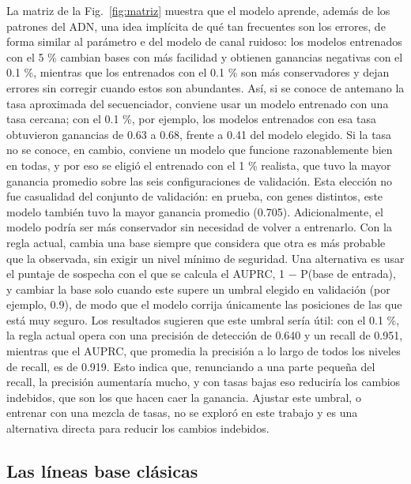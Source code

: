 \documentclass[sigconf,nonacm]{acmart}
\begin{document}
La matriz de la Fig.~\ref{fig:matriz} muestra que el modelo aprende, además de los patrones del ADN, una idea implícita de qué tan frecuentes son los errores, de forma similar al parámetro e del modelo de canal ruidoso: los modelos entrenados con el 5 \% cambian bases con más facilidad y obtienen ganancias negativas con el 0.1 \%, mientras que los entrenados con el 0.1 \% son más conservadores y dejan errores sin corregir cuando estos son abundantes. Así, si se conoce de antemano la tasa aproximada del secuenciador, conviene usar un modelo entrenado con una tasa cercana; con el 0.1 \%, por ejemplo, los modelos entrenados con esa tasa obtuvieron ganancias de 0.63 a 0.68, frente a 0.41 del modelo elegido. Si la tasa no se conoce, en cambio, conviene un modelo que funcione razonablemente bien en todas, y por eso se eligió el entrenado con el 1 \% realista, que tuvo la mayor ganancia promedio sobre las seis configuraciones de validación. Esta elección no fue casualidad del conjunto de validación: en prueba, con genes distintos, este modelo también tuvo la mayor ganancia promedio (0.705). Adicionalmente, el modelo podría ser más conservador sin necesidad de volver a entrenarlo. Con la regla actual, cambia una base siempre que considera que otra es más probable que la observada, sin exigir un nivel mínimo de seguridad. Una alternativa es usar el puntaje de sospecha con el que se calcula el AUPRC, 1 − P(base de entrada), y cambiar la base solo cuando este supere un umbral elegido en validación (por ejemplo, 0.9), de modo que el modelo corrija únicamente las posiciones de las que está muy seguro. Los resultados sugieren que este umbral sería útil: con el 0.1 \%, la regla actual opera con una precisión de detección de 0.640 y un recall de 0.951, mientras que el AUPRC, que promedia la precisión a lo largo de todos los niveles de recall, es de 0.919. Esto indica que, renunciando a una parte pequeña del recall, la precisión aumentaría mucho, y con tasas bajas eso reduciría los cambios indebidos, que son los que hacen caer la ganancia. Ajustar este umbral, o entrenar con una mezcla de tasas, no se exploró en este trabajo y es una alternativa directa para reducir los cambios indebidos.

\subsection{Las líneas base clásicas}\label{sec:disc-lineas-base}
\end{document}
